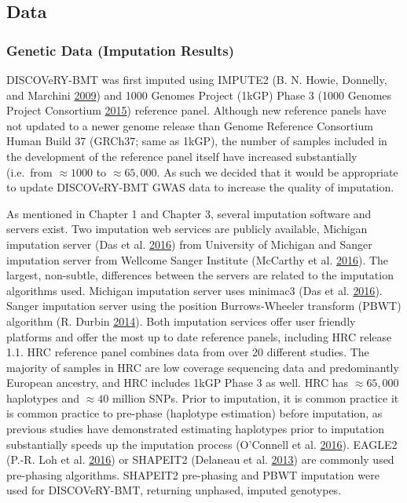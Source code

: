\documentclass[]{DissertateOSU}
\begin{document}

\subsection{Data}\label{data}

\subsubsection{Genetic Data (Imputation
Results)}\label{genetic-data-imputation-results}

DISCOVeRY-BMT was first imputed using IMPUTE2 (B. N. Howie, Donnelly,
and Marchini \protect\hyperlink{ref-Howie_2009}{2009}) and 1000 Genomes
Project (1kGP) Phase 3 (1000 Genomes Project Consortium
\protect\hyperlink{ref-1000genomes}{2015}) reference panel. Although new
reference panels have not updated to a newer genome release than Genome
Reference Consortium Human Build 37 (GRCh37; same as 1kGP), the number
of samples included in the development of the reference panel itself
have increased substantially (i.e.~from \(\approx 1000\) to
\(\approx 65,000\). As such we decided that it would be appropriate to
update DISCOVeRY-BMT GWAS data to increase the quality of imputation.

As mentioned in Chapter 1 and Chapter 3, several imputation software and
servers exist. Two imputation web services are publicly available,
Michigan imputation server (Das et al.
\protect\hyperlink{ref-michigan_imputation}{2016}) from University of
Michigan and Sanger imputation server from Wellcome Sanger Institute
(McCarthy et al. \protect\hyperlink{ref-hrc}{2016}). The largest,
non-subtle, differences between the servers are related to the
imputation algorithms used. Michigan imputation server uses minimac3
(Das et al. \protect\hyperlink{ref-michigan_imputation}{2016}). Sanger
imputation server using the position Burrows-Wheeler transform (PBWT)
algorithm (R. Durbin \protect\hyperlink{ref-durbin_2014}{2014}). Both
imputation services offer user friendly platforms and offer the most up
to date reference panels, including HRC release 1.1. HRC reference panel
combines data from over 20 different studies. The majority of samples in
HRC are low coverage sequencing data and predominantly European
ancestry, and HRC includes 1kGP Phase 3 as well. HRC has
\(\approx 65,000\) haplotypes and \(\approx 40\) million SNPs. Prior to
imputation, it is common practice it is common practice to pre-phase
(haplotype estimation) before imputation, as previous studies have
demonstrated estimating haplotypes prior to imputation substantially
speeds up the imputation process (O'Connell et al.
\protect\hyperlink{ref-OConnell_2016}{2016}). EAGLE2 (P.-R. Loh et al.
\protect\hyperlink{ref-eagle2}{2016}) or SHAPEIT2 (Delaneau et al.
\protect\hyperlink{ref-shapeit2}{2013}) are commonly used pre-phasing
algorithms. SHAPEIT2 pre-phasing and PBWT imputation were used for
DISCOVeRY-BMT, returning unphased, imputed genotypes.
\end{document}

